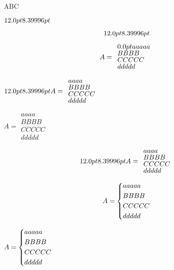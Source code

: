 \makeatother

ABC

\baselineskip=12.0pt
$\the\baselineskip \the\ht\strutbox$

$$\the\baselineskip \the\ht\strutbox$$

\the\baselineskip


\setlength{\abovedisplayskip}{0pt}
\setlength{\belowdisplayskip}{0pt}
\setlength{\abovedisplayshortskip}{0pt}
\setlength{\belowdisplayshortskip}{0pt}


$$A=\begin{array}{l}\the\baselineskip aaaaa\\BBBB\\CCCCC\\ddddd\end{array}$$

$\the\baselineskip \the\ht\strutbox A=\begin{array}{l}aaaa\\BBBB\\CCCCC\\ddddd\end{array}$

$ \renewcommand{\arraystretch}{0.8} A=\begin{array}{l}aaaa\\BBBB\\CCCCC\\ddddd\end{array}$

$$\the\baselineskip \the\ht\strutbox A=\begin{array}{l}aaaa\\BBBB\\CCCCC\\ddddd\end{array}$$

$$A=\begin{dcases}aaaaa\\BBBB\\CCCCC\\ddddd\end{dcases}$$

$\baselineskip=12pt \renewcommand{\arraystretch}{0.8} A=\begin{dcases}aaaaa\\BBBB\\CCCCC\\ddddd\end{dcases}$


